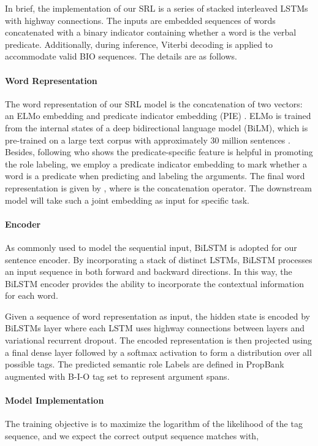\documentclass[11pt]{article}
\begin{document}
In brief, the implementation of our SRL is a series of stacked interleaved LSTMs with highway connections. The inputs are embedded sequences of words concatenated with a binary indicator containing whether a word is the verbal predicate. Additionally, during inference, Viterbi decoding is applied to accommodate valid BIO sequences. The details are as follows.

\paragraph{Word Representation}
The word representation of our SRL model is the concatenation of two vectors: an ELMo embedding  and predicate indicator embedding (PIE) . ELMo is trained from the internal states of a deep bidirectional language model (BiLM), which is pre-trained on a large text corpus with approximately 30
million sentences \citep{Chelba2014One}. Besides, following \citep{li2019dependency} who shows the predicate-specific feature is helpful in promoting the role labeling, we employ a predicate indicator embedding  to mark whether a word is a predicate when predicting and labeling the arguments. The final word representation is given by , where  is the concatenation operator. The downstream model will take such a joint embedding as input for specific task.

\paragraph{Encoder} 
As commonly used to model the sequential input, BiLSTM is adopted for our sentence encoder. By incorporating a stack of distinct LSTMs, BiLSTM processes an input sequence in both forward and backward directions. In this way, the BiLSTM encoder provides the ability to incorporate the contextual information for each word. 

Given a sequence of word representation  as input, the hidden state  is encoded by BiLSTMs layer where each LSTM uses highway connections between layers and variational recurrent dropout. The encoded representation is then projected using a final dense layer followed by a softmax activation to form a distribution over all possible tags. The predicted semantic role Labels are defined in PropBank \citep{Palmer2005The} augmented with B-I-O tag set to represent argument spans. 

\paragraph{Model Implementation}
The training objective is to maximize the logarithm of the likelihood of the tag sequence, and we expect the correct output sequence matches with,
\end{document}

